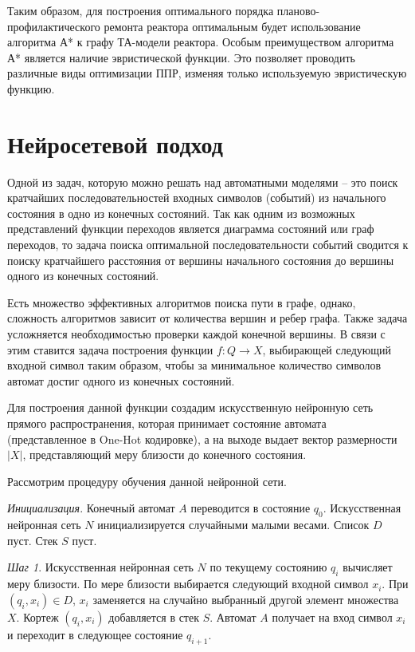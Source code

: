 Таким образом, для построения оптимального порядка планово-профилактического ремонта реактора оптимальным будет использование алгоритма А* к графу ТА-модели реактора.
Особым преимуществом алгоритма А* является наличие эвристической функции.
Это позволяет проводить различные виды оптимизации ППР, изменяя только используемую эвристическую функцию.

\section{Нейросетевой подход}

Одной из задач, которую можно решать над автоматными моделями -- это
поиск кратчайших последовательностей входных символов (событий) из
начального состояния в одно из конечных состояний. Так как одним из
возможных представлений функции переходов является диаграмма состояний
или граф переходов, то задача поиска оптимальной последовательности
событий сводится к поиску кратчайшего расстояния от вершины начального
состояния до вершины одного из конечных состояний.

Есть множество эффективных алгоритмов поиска пути в графе, однако,
сложность алгоритмов зависит от количества вершин и ребер графа. Также
задача усложняется необходимостью проверки каждой конечной вершины. В
связи с этим ставится задача построения функции \(f:Q \rightarrow X\),
выбирающей следующий входной символ таким образом, чтобы за минимальное
количество символов автомат достиг одного из конечных состояний.

Для построения данной функции создадим искусственную нейронную сеть
прямого распространения, которая принимает состояние автомата
(представленное в One-Hot кодировке), а на выходе выдает вектор
размерности \(\left| X \right|\), представляющий меру близости до
конечного состояния.

Рассмотрим процедуру обучения данной нейронной сети.

\emph{Инициализация}. Конечный автомат \(A\) переводится в состояние
    \(q_{0}\). Искусственная нейронная сеть \(N\) инициализируется
    случайными малыми весами. Список \(D\) пуст. Стек \(S\) пуст.
    
    \emph{Шаг 1}. Искусственная нейронная сеть \(N\) по текущему состоянию
    \(q_{i}\) вычисляет меру близости. По мере близости выбирается следующий
    входной символ \(x_{i}\). При \(\left( q_{i},x_{i} \right) \in D\),
    \(x_{i}\) заменяется на случайно выбранный другой элемент множества
    \(X\). Кортеж \(\left( q_{i},x_{i} \right)\) добавляется в стек \(S\).
    Автомат \(A\) получает на вход символ \(x_{i}\) и переходит в следующее
    состояние \(q_{i + 1}\).
    
